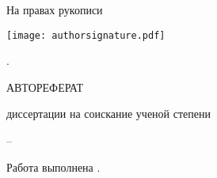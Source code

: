 
%
%
%
%

\thispagestyle{empty}

\begin{center}
	\disscouncil
	\par
\end{center}

\vspace{10mm}
\begin{flushright}
На правах рукописи

\texttt{[image: authorsignature.pdf]}\hspace{0.75cm}

\end{flushright}

\vspace{-4mm}
\begin{center}
{\bf \large \dissauthor}
\end{center}

\vspace{2mm}
\begin{center}
{\bf \large \disstitle
\par}

\vspace{10mm}
{%
\specnum. \specname
}

\vspace{10mm}
\MakeUppercase{Автореферат}

диссертации на соискание ученой степени

\edudegree
\end{center}


\vfill
\begin{center}
{\disscouncilcity -- \dissyear}
\end{center}



\newpage
\thispagestyle{empty}
Работа выполнена \dissorgsyn.

